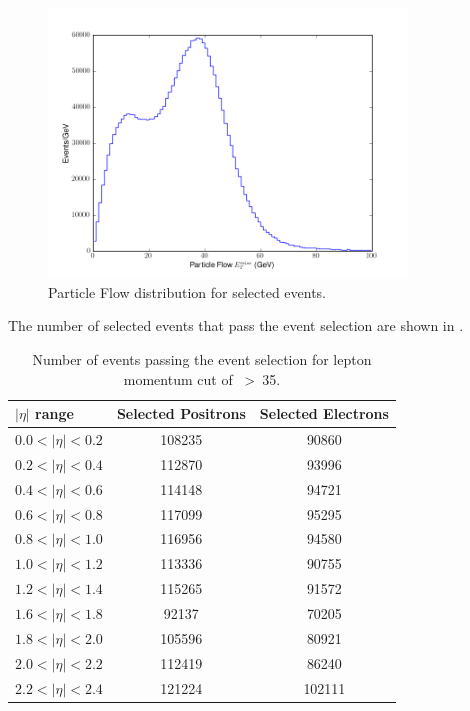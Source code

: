 \begin{figure}[htbp]
  \centering
  \includegraphics*[width=0.85\textwidth]{pfmet_update}
  \caption{Particle Flow \ETm distribution for selected events.}
  \label{fig:pfmet}
\end{figure}

The number of selected events that pass the event selection are shown in
. 

\begin{table}[htbp]
 \begin{center}
 \begin{tabular}{lcc}
\toprule
 $|\eta|$ range & Selected Positrons & Selected Electrons\\
 \midrule
 $0.0<| \eta |<0.2$ & 108235 &  90860 \\
 $0.2<| \eta |<0.4$ & 112870 &  93996 \\
 $0.4<| \eta |<0.6$ & 114148 &  94721 \\
 $0.6<| \eta |<0.8$ & 117099 &  95295 \\
 $0.8<| \eta |<1.0$ & 116956 &  94580 \\
 $1.0<| \eta |<1.2$ & 113336 &  90755 \\
 $1.2<| \eta |<1.4$ & 115265 &  91572 \\
 $1.6<| \eta |<1.8$ &  92137 &  70205 \\
 $1.8<| \eta |<2.0$ & 105596 &  80921 \\
 $2.0<| \eta |<2.2$ & 112419 &  86240 \\
 $2.2<| \eta |<2.4$ & 121224 & 102111 \\
\bottomrule
 \end{tabular}
 \caption{Number of events passing the event selection for lepton momentum cut
 of \unit{\PT>35}{\GeV}.}
\label{tab:updatedselectedevents}
\end{center}
\end{table}


